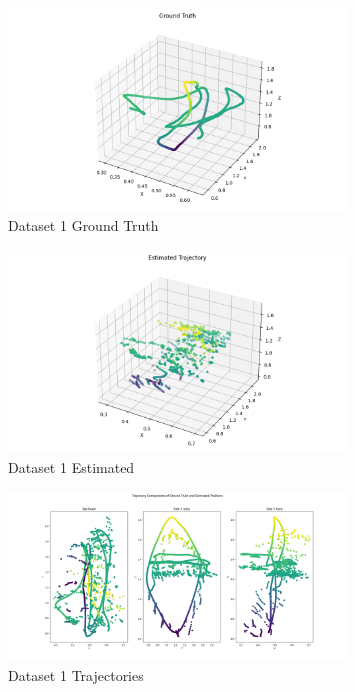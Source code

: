 \documentclass{article}
\begin{document}
\begin{figure}[H]
    \centering
    \includegraphics[width=0.8\textwidth]{./imgs/task1_2/studentdata1_ground_truth.png}
    \caption{Dataset 1 Ground Truth}
\end{figure}

\begin{figure}[H]
    \centering
    \includegraphics[width=0.8\textwidth]{./imgs/task1_2/studentdata1_estimated.png}
    \caption{Dataset 1 Estimated}
\end{figure}

\begin{figure}[H]
    \centering
    \includegraphics[width=0.8\textwidth]{./imgs/task1_2/studentdata1_trajectory_merged.png}
    \caption{Dataset 1 Trajectories}
\end{figure}
\end{document}
